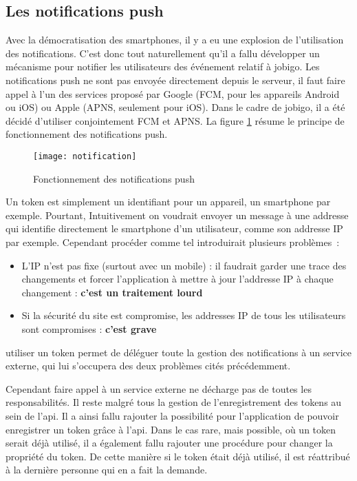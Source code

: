 \documentclass[rapport.tex]{subfiles}
\begin{document}
        \subsection{Les notifications push}
        Avec la démocratisation des smartphones, il y a eu une explosion de l'utilisation des notifications. C'est donc tout naturellement
        qu'il a fallu développer un mécanisme pour notifier les utilisateurs
        des événement relatif à jobigo.
        Les notifications push ne sont pas envoyée directement depuis le
        serveur, il faut faire appel à l'un des services proposé par Google
        (FCM, pour les appareils Android ou iOS) ou Apple (APNS, seulement pour
        iOS). Dans le cadre de jobigo, il a été décidé d'utiliser conjointement
        FCM et APNS.
        La figure \ref{fig:notification} résume le principe de fonctionnement des notifications push.

        \begin{figure}
            \centering
            \texttt{[image: notification]}
            \caption{Fonctionnement des notifications push}
            \label{fig:notification}
        \end{figure}

        Un token est simplement un identifiant pour un appareil, un smartphone
        par exemple. Pourtant, Intuitivement on voudrait envoyer un message à
        une addresse qui identifie directement le smartphone d'un utilisateur,
        comme son addresse IP par exemple. Cependant procéder comme tel
        introduirait plusieurs problèmes~:
    \begin{itemize}
        \item L'IP n'est pas fixe (surtout avec un mobile) : il faudrait garder
            une trace des changements et forcer l'application à mettre à jour l'addresse IP à chaque
            changement : \textbf{c'est un traitement lourd}
        \item Si la sécurité du site est compromise, les addresses IP de tous
            les utilisateurs sont compromises : \textbf{c'est grave}
    \end{itemize}
        utiliser un token permet de déléguer toute la gestion des notifications à un service externe, qui lui s'occupera des deux problèmes
        cités précédemment.

        Cependant faire appel à un service externe ne décharge pas de toutes les responsabilités.
        Il reste malgré tous la gestion de l'enregistrement des \glspl{token} au sein de l'\gls{api}.
        Il a ainsi fallu rajouter la possibilité pour l'application de pouvoir enregistrer un \gls{token} grâce à l'\gls{api}.
        Dans le cas rare, mais possible, où un \gls{token} serait déjà utilisé, il a également fallu rajouter
        une procédure pour changer la propriété du \gls{token}. De cette manière si le \gls{token} était déjà utilisé, 
        il est réattribué à la dernière personne qui en a fait la demande.
\end{document}
